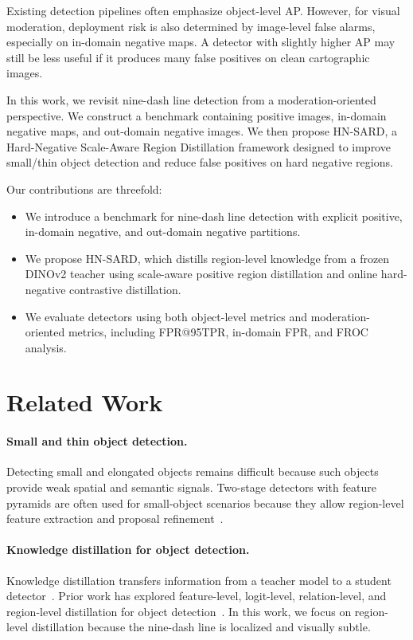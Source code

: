 \documentclass[conference,a4paper]{IEEEtran}
\begin{document}
Existing detection pipelines often emphasize object-level AP.
However, for visual moderation, deployment risk is also determined by image-level false alarms, especially on in-domain negative maps.
A detector with slightly higher AP may still be less useful if it produces many false positives on clean cartographic images.

In this work, we revisit nine-dash line detection from a moderation-oriented perspective.
We construct a benchmark containing positive images, in-domain negative maps, and out-domain negative images.
We then propose HN-SARD, a Hard-Negative Scale-Aware Region Distillation framework designed to improve small/thin object detection and reduce false positives on hard negative regions.

Our contributions are threefold:
\begin{itemize}
    \item We introduce a benchmark for nine-dash line detection with explicit positive, in-domain negative, and out-domain negative partitions.
    \item We propose HN-SARD, which distills region-level knowledge from a frozen DINOv2 teacher using scale-aware positive region distillation and online hard-negative contrastive distillation.
    \item We evaluate detectors using both object-level metrics and moderation-oriented metrics, including FPR@95TPR, in-domain FPR, and FROC analysis.
\end{itemize}

\section{Related Work}

\paragraph{Small and thin object detection.}
Detecting small and elongated objects remains difficult because such objects provide weak spatial and semantic signals.
Two-stage detectors with feature pyramids are often used for small-object scenarios because they allow region-level feature extraction and proposal refinement~\cite{ren2015faster,lin2017feature}.

\paragraph{Knowledge distillation for object detection.}
Knowledge distillation transfers information from a teacher model to a student detector~\cite{hinton2015distilling}.
Prior work has explored feature-level, logit-level, relation-level, and region-level distillation for object detection~\cite{wang2019distilling}.
In this work, we focus on region-level distillation because the nine-dash line is localized and visually subtle.
\end{document}
